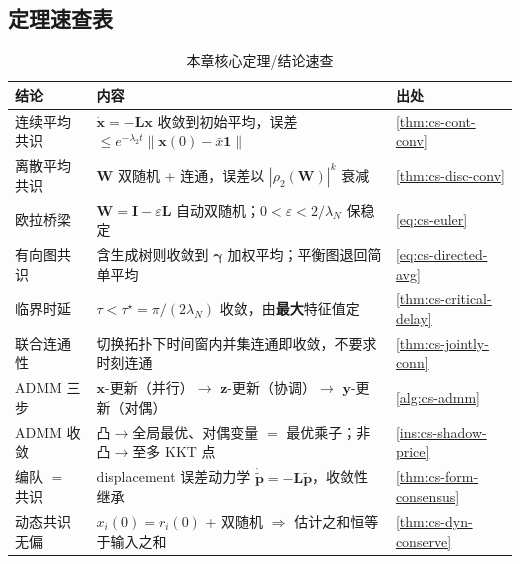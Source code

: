 \subsection*{定理速查表}
\begin{table}[H]\centering\small
\caption{本章核心定理/结论速查}
\label{tab:cs-theorems}
\begin{tabular}{p{3.2cm}p{7.2cm}p{3.0cm}}
\toprule
结论 & 内容 & 出处 \\
\midrule
连续平均共识 & $\dot{\mathbf{x}}=-\mathbf{L}\mathbf{x}$ 收敛到初始平均，误差 $\le e^{-\lambda_2 t}\|\mathbf{x}(0)-\bar x\mathbf{1}\|$ & \cref{thm:cs-cont-conv} \\
离散平均共识 & $\mathbf{W}$ 双随机 + 连通，误差以 $|\rho_2(\mathbf{W})|^k$ 衰减 & \cref{thm:cs-disc-conv} \\
欧拉桥梁 & $\mathbf{W}=\mathbf{I}-\varepsilon\mathbf{L}$ 自动双随机；$0<\varepsilon<2/\lambda_N$ 保稳定 & \cref{eq:cs-euler} \\
有向图共识 & 含生成树则收敛到 $\boldsymbol{\gamma}$ 加权平均；平衡图退回简单平均 & \cref{eq:cs-directed-avg} \\
临界时延 & $\tau<\tau^\star=\pi/(2\lambda_N)$ 收敛，由\textbf{最大}特征值定 & \cref{thm:cs-critical-delay} \\
联合连通性 & 切换拓扑下时间窗内并集连通即收敛，不要求时刻连通 & \cref{thm:cs-jointly-conn} \\
ADMM 三步 & $\mathbf{x}$-更新（并行）$\to$ $\mathbf{z}$-更新（协调）$\to$ $\mathbf{y}$-更新（对偶） & \cref{alg:cs-admm} \\
ADMM 收敛 & 凸$\to$全局最优、对偶变量 $=$ 最优乘子；非凸$\to$至多 KKT 点 & \cref{ins:cs-shadow-price} \\
编队 $=$ 共识 & displacement 误差动力学 $\dot{\tilde{\mathbf{p}}}=-\mathbf{L}\tilde{\mathbf{p}}$，收敛性继承 & \cref{thm:cs-form-consensus} \\
动态共识无偏 & $x_i(0)=r_i(0)$ + 双随机 $\Rightarrow$ 估计之和恒等于输入之和 & \cref{thm:cs-dyn-conserve} \\
\bottomrule
\end{tabular}
\end{table}

